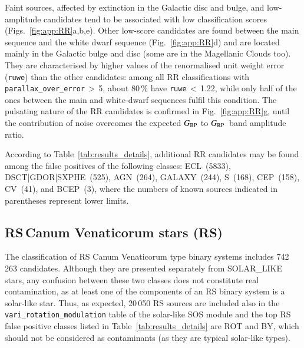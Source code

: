 \documentclass[longauth]{aa}
\def\bp{$G_{\rm BP}$\xspace}
\def\rp{$G_{\rm RP}$\xspace}
\begin{document}
Faint sources, affected by extinction in the Galactic disc and bulge, and low-amplitude candidates tend to be associated with low classification scores (Figs.~\ref{fig:app:RR}a,b,e).
Other low-score candidates are found between the main sequence and the white dwarf sequence (Fig.~\ref{fig:app:RR}d) and are located mainly in the Galactic bulge and disc (some are in the Magellanic Clouds too). They are characterised by higher values of the renormalised unit weight error (\texttt{ruwe}) than the other candidates: among all RR classifications with \texttt{parallax\_over\_error}\,$>$\,5, about 80\,\% have \texttt{ruwe}\,$<$\,1.22, while only half of the ones between the main and white-dwarf sequences fulfil this condition.
The pulsating nature of the RR candidates is confirmed in Fig.~\ref{fig:app:RR}g, until the contribution of noise overcomes the expected \bp to \rp~band amplitude ratio.

According to Table~\ref{tab:results_details}, additional RR candidates may be found among the false positives of the following classes: ECL~(5833), DSCT|GDOR|SXPHE~(525),  AGN~(264), GALAXY~(244), S~(168), CEP~(158), CV~(41), and BCEP~(3), where the numbers of known sources indicated in parentheses represent lower limits.


\subsection{RS\,Canum Venaticorum stars (RS)\label{ssec:rs}}


The classification of RS Canum Venaticorum type binary systems includes 742\,263 candidates. Although they are presented separately from SOLAR\_LIKE stars, any confusion between these two classes does not constitute real contamination, as at least one of the components of an RS binary system is a solar-like star.  
Thus, as expected, 20\,050 RS sources are included also in the  \texttt{vari\_rotation\_modulation} table of the solar-like SOS module \citep{DR3-DPACP-173} and the top RS false positive classes listed in Table~\ref{tab:results_details} are ROT and BY, which should not be considered as contaminants (as they are typical solar-like types).
\end{document}
